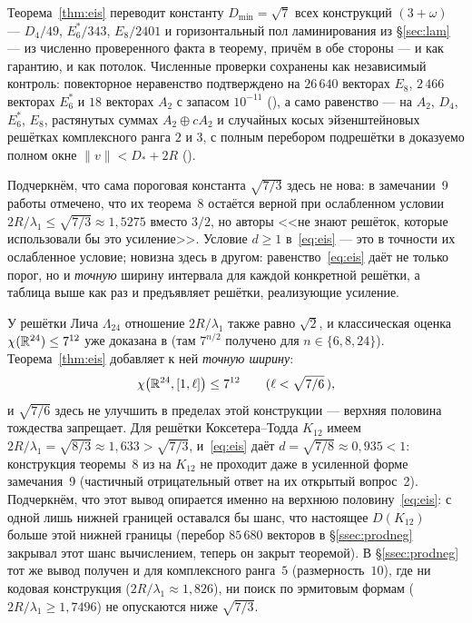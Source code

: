 Теорема~\ref{thm:eis} переводит константу $D_{\min}=\sqrt7$ всех
конструкций $(3+\omega)$ --- $D_4/49$, $E_6^*/343$, $E_8/2401$ и
горизонтальный пол ламинирования из \S\ref{sec:lam} --- из численно
проверенного факта в теорему, причём в обе стороны --- и как гарантию, и как
потолок. Численные проверки сохранены как независимый контроль: повекторное
неравенство подтверждено на $26\,640$ векторах $E_8$, $2\,466$ векторах
$E_6^*$ и $18$ векторах $A_2$ с запасом $10^{-11}$
(), а само равенство ---
на $A_2$, $D_4$, $E_6^*$, $E_8$, растянутых суммах $A_2\oplus cA_2$ и случайных
косых эйзенштейновых решётках комплексного ранга $2$ и $3$, с полным перебором
подрешётки в доказуемо полном окне $\|v\|<D_*+2R$
().

Подчеркнём, что сама пороговая константа $\sqrt{7/3}$ здесь не нова: в
замечании~9 работы \cite{ABPR} отмечено, что их теорема~8 остаётся верной при
ослабленном условии $2R/\lambda_1\le\sqrt{7/3}\approx1{,}5275$ вместо $3/2$,
но авторы <<не знают решёток, которые использовали бы это усиление>>. Условие
$d\ge1$ в~\eqref{eq:eis} --- это в точности их ослабленное условие; новизна
здесь в другом: равенство~\eqref{eq:eis} даёт не только порог, но и \emph{точную}
ширину интервала для каждой конкретной решётки, а таблица выше как раз и
предъявляет решётки, реализующие усиление.

У решётки Лича $\Lambda_{24}$ отношение $2R/\lambda_1$ также равно $\sqrt2$, и
классическая оценка $\chi(\mathbb{R}^{24})\le7^{12}$ уже доказана в \cite{ABPR}
(там $7^{n/2}$ получено для $n\in\{6,8,24\}$). Теорема~\ref{thm:eis} добавляет
к ней \emph{точную ширину}:
\[
\chi\bigl(\mathbb{R}^{24},[1,\ell]\bigr)\le7^{12}\qquad(\ell<\sqrt{7/6}\,),
\]
и $\sqrt{7/6}$ здесь не улучшить в пределах этой конструкции --- верхняя
половина тождества запрещает. Для решётки Коксетера--Тодда $K_{12}$ имеем
$2R/\lambda_1=\sqrt{8/3}\approx1{,}633>\sqrt{7/3}$, и~\eqref{eq:eis} даёт
$d=\sqrt{7/8}\approx0{,}935<1$: конструкция теоремы~8 из \cite{ABPR} на
$K_{12}$ не проходит даже в усиленной форме замечания~9 (частичный
отрицательный ответ на их открытый вопрос~2). Подчеркнём, что этот вывод
опирается именно на верхнюю половину~\eqref{eq:eis}: с одной лишь нижней
границей оставался бы шанс, что настоящее $D(K_{12})$ больше этой нижней границы
(перебор $85\,680$ векторов в \S\ref{ssec:prodneg} закрывал этот шанс
вычислением, теперь он закрыт теоремой). В \S\ref{ssec:prodneg} тот же вывод
получен и для комплексного ранга~$5$ (размерность~$10$), где ни кодовая
конструкция ($2R/\lambda_1\approx1{,}826$), ни поиск по эрмитовым формам
($2R/\lambda_1\ge1{,}7496$) не опускаются ниже $\sqrt{7/3}$.

